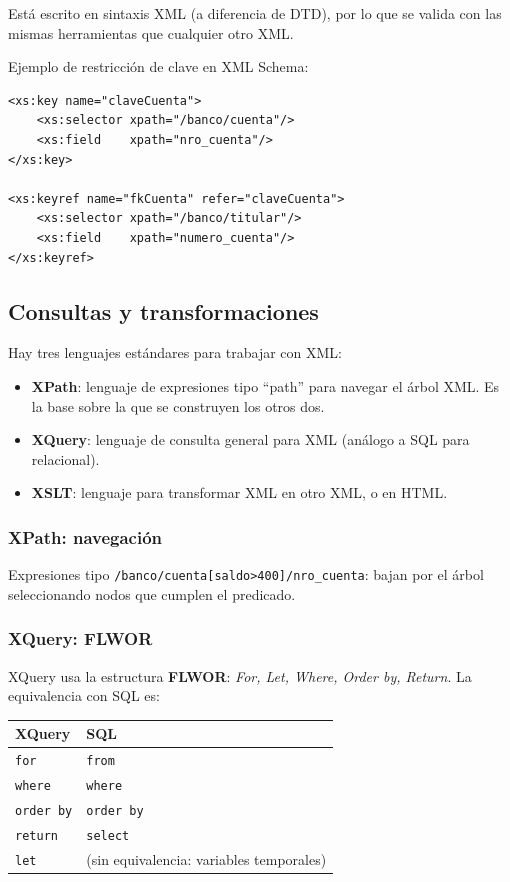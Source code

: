 \documentclass[11pt,a4paper]{article}
\begin{document}
Está escrito en sintaxis XML (a diferencia de DTD), por lo que se valida
con las mismas herramientas que cualquier otro XML.

Ejemplo de restricción de clave en XML Schema:

\begin{lstlisting}
<xs:key name="claveCuenta">
    <xs:selector xpath="/banco/cuenta"/>
    <xs:field    xpath="nro_cuenta"/>
</xs:key>

<xs:keyref name="fkCuenta" refer="claveCuenta">
    <xs:selector xpath="/banco/titular"/>
    <xs:field    xpath="numero_cuenta"/>
</xs:keyref>
\end{lstlisting}

\subsection{Consultas y transformaciones}

Hay tres lenguajes estándares para trabajar con XML:

\begin{itemize}
    \item \textbf{XPath}: lenguaje de expresiones tipo ``path'' para
    navegar el árbol XML. Es la base sobre la que se construyen los
    otros dos.
    \item \textbf{XQuery}: lenguaje de consulta general para XML
    (análogo a SQL para relacional).
    \item \textbf{XSLT}: lenguaje para transformar XML en otro XML, o
    en HTML.
\end{itemize}

\subsubsection*{XPath: navegación}

Expresiones tipo \texttt{/banco/cuenta[saldo>400]/nro\_cuenta}: bajan
por el árbol seleccionando nodos que cumplen el predicado.

\subsubsection*{XQuery: FLWOR}

XQuery usa la estructura \textbf{FLWOR}: \emph{For, Let, Where, Order by,
Return}. La equivalencia con SQL es:

\begin{center}
\begin{tabular}{ll}
\toprule
XQuery & SQL \\
\midrule
\texttt{for}      & \texttt{from}     \\
\texttt{where}    & \texttt{where}    \\
\texttt{order by} & \texttt{order by} \\
\texttt{return}   & \texttt{select}   \\
\texttt{let}      & (sin equivalencia: variables temporales) \\
\bottomrule
\end{tabular}
\end{center}
\end{document}
